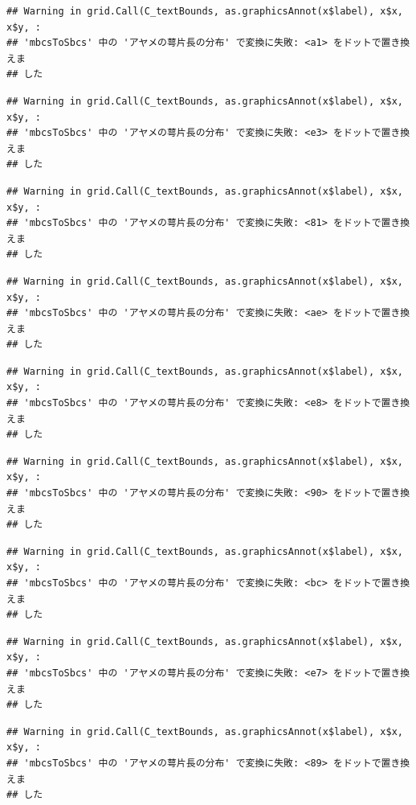 \documentclass[
]{book}
\begin{document}
\begin{verbatim}
## Warning in grid.Call(C_textBounds, as.graphicsAnnot(x$label), x$x, x$y, :
## 'mbcsToSbcs' 中の 'アヤメの萼片長の分布' で変換に失敗: <a1> をドットで置き換えま
## した
\end{verbatim}

\begin{verbatim}
## Warning in grid.Call(C_textBounds, as.graphicsAnnot(x$label), x$x, x$y, :
## 'mbcsToSbcs' 中の 'アヤメの萼片長の分布' で変換に失敗: <e3> をドットで置き換えま
## した
\end{verbatim}

\begin{verbatim}
## Warning in grid.Call(C_textBounds, as.graphicsAnnot(x$label), x$x, x$y, :
## 'mbcsToSbcs' 中の 'アヤメの萼片長の分布' で変換に失敗: <81> をドットで置き換えま
## した
\end{verbatim}

\begin{verbatim}
## Warning in grid.Call(C_textBounds, as.graphicsAnnot(x$label), x$x, x$y, :
## 'mbcsToSbcs' 中の 'アヤメの萼片長の分布' で変換に失敗: <ae> をドットで置き換えま
## した
\end{verbatim}

\begin{verbatim}
## Warning in grid.Call(C_textBounds, as.graphicsAnnot(x$label), x$x, x$y, :
## 'mbcsToSbcs' 中の 'アヤメの萼片長の分布' で変換に失敗: <e8> をドットで置き換えま
## した
\end{verbatim}

\begin{verbatim}
## Warning in grid.Call(C_textBounds, as.graphicsAnnot(x$label), x$x, x$y, :
## 'mbcsToSbcs' 中の 'アヤメの萼片長の分布' で変換に失敗: <90> をドットで置き換えま
## した
\end{verbatim}

\begin{verbatim}
## Warning in grid.Call(C_textBounds, as.graphicsAnnot(x$label), x$x, x$y, :
## 'mbcsToSbcs' 中の 'アヤメの萼片長の分布' で変換に失敗: <bc> をドットで置き換えま
## した
\end{verbatim}

\begin{verbatim}
## Warning in grid.Call(C_textBounds, as.graphicsAnnot(x$label), x$x, x$y, :
## 'mbcsToSbcs' 中の 'アヤメの萼片長の分布' で変換に失敗: <e7> をドットで置き換えま
## した
\end{verbatim}

\begin{verbatim}
## Warning in grid.Call(C_textBounds, as.graphicsAnnot(x$label), x$x, x$y, :
## 'mbcsToSbcs' 中の 'アヤメの萼片長の分布' で変換に失敗: <89> をドットで置き換えま
## した
\end{verbatim}
\end{document}
